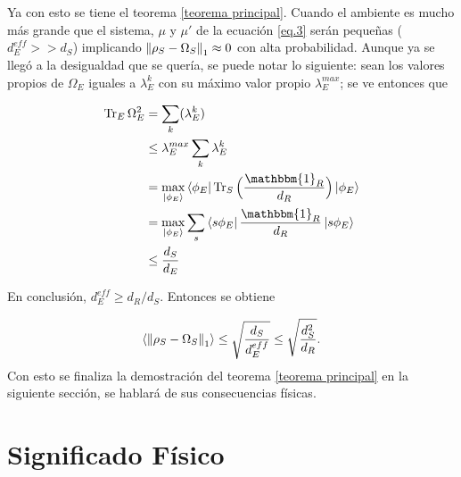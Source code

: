 Ya con esto se tiene el teorema \ref{teorema principal}. Cuando  el ambiente es mucho más grande que el sistema, $\mu$ y $\mu'$  de la ecuación \ref{eq.3} serán pequeñas ($d_{E}^{eff}>>d_{S}$) implicando $\norm{\rho_{S} -\Omega_{S}}_{1} \approx 0$ con alta probabilidad. Aunque ya se llegó a la desigualdad que se quería, se puede notar lo siguiente: sean los valores propios de $\Omega_{E}$ iguales a $\lambda_{E}^{k}$ con su máximo valor propio $\lambda_{E}^{max}$; se ve entonces que 

\begin{align*}
\Tr_{E} \Omega_{E}^{2} &= \sum_{k} (\lambda_{E}^{k})\\
&\leq \lambda_{E}^{max} \sum_{k} \lambda_{E}^{k}\\
&= \max_{\ket{\phi_{E}}} \bra{\phi_{E}} \Tr_{S} \Big( \frac{\mathbbm{1}_{R}}{d_{R}} \Big) \ket{\phi_{E}}\\
&= \max_{\ket{\phi_{E}}} \sum_{s} \bra{s \phi_{E}} \frac{\mathbbm{1}_{R}}{d_{R}} \ket{s \phi_{E}} \\
&\leq \frac{d_{S}}{d_{E}}	
\end{align*}

En conclusión, $d^{eff}_{E} \geq d_{R}/ d_{S}$. Entonces se obtiene

\begin{equation}
\langle \norm{\rho_{S} - \Omega_{S}}_{1} \rangle \leq \sqrt{\frac{d_{S}}{d_{E}^{eff}}} \leq  \sqrt{\frac{d_{S}^{2}}{d_{R}}}.
\end{equation}
Con esto se finaliza la demostración del teorema \ref{teorema principal} en la siguiente sección, se hablará de sus consecuencias físicas.

\section{Significado Físico}

